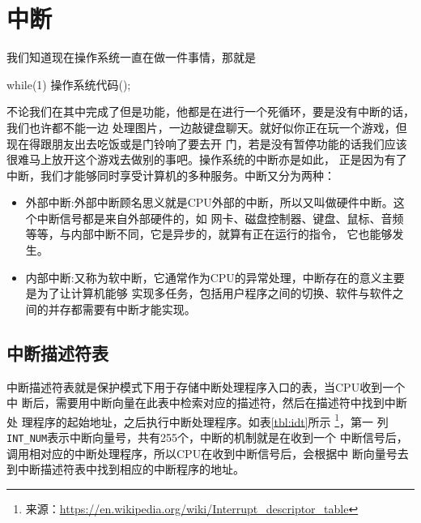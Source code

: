 \section{中断}
\label{sec:interrupt}

我们知道现在操作系统一直在做一件事情，那就是
\begin{codeblock}
\begin{ccode}
while(1)
{
  操作系统代码();
}
\end{ccode}  
\end{codeblock}
不论我们在其中完成了但是功能，他都是在进行一个死循环，要是没有中断的话，我们也许都不能一边
处理图片，一边敲键盘聊天。就好似你正在玩一个游戏，但现在得跟朋友出去吃饭或是门铃响了要去开
门，若是没有暂停功能的话我们应该很难马上放开这个游戏去做别的事吧。操作系统的中断亦是如此，
正是因为有了中断，我们才能够同时享受计算机的多种服务。中断又分为两种：
\begin{itemize}
\item 外部中断:外部中断顾名思义就是CPU外部的中断，所以又叫做硬件中断。这个中断信号都是来自外部硬件的，如
网卡、磁盘控制器、键盘、鼠标、音频等等，与内部中断不同，它是异步的，就算有正在运行的指令，
它也能够发生。
\item 内部中断:又称为软中断，它通常作为CPU的异常处理，中断存在的意义主要是为了让计算机能够
  实现多任务，包括用户程序之间的切换、软件与软件之间的并存都需要有中断才能实现。
\end{itemize}

\subsection{中断描述符表}

中断描述符表就是保护模式下用于存储中断处理程序入口的表，当CPU收到一个中
断后，需要用中断向量在此表中检索对应的描述符，然后在描述符中找到中断处
理程序的起始地址，之后执行中断处理程序。如表\ref{tbl:idt}所示
\footnote{来源：\url{https://en.wikipedia.org/wiki/Interrupt_descriptor_table}}，第一
列\texttt{INT\_NUM}表示中断向量号，共有255个，中断的机制就是在收到一个
中断信号后，调用相对应的中断处理程序，所以CPU在收到中断信号后，会根据中
断向量号去到中断描述符表中找到相应的中断程序的地址。

